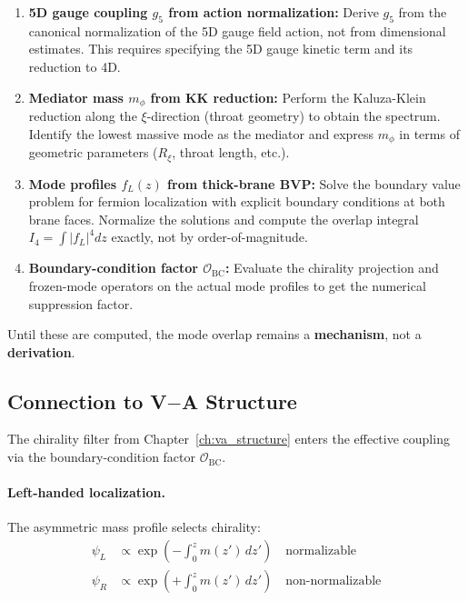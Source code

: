 \begin{enumerate}[nosep]
    \item \textbf{5D gauge coupling $g_5$ from action normalization:}
          Derive $g_5$ from the canonical normalization of the 5D gauge field
          action, not from dimensional estimates. This requires specifying the
          5D gauge kinetic term and its reduction to 4D.

    \item \textbf{Mediator mass $m_\phi$ from KK reduction:}
          Perform the Kaluza-Klein reduction along the $\xi$-direction (throat
          geometry) to obtain the spectrum. Identify the lowest massive mode
          as the mediator and express $m_\phi$ in terms of geometric parameters
          ($R_\xi$, throat length, etc.).

    \item \textbf{Mode profiles $f_L(z)$ from thick-brane BVP:}
          Solve the boundary value problem for fermion localization with
          explicit boundary conditions at both brane faces. Normalize the
          solutions and compute the overlap integral $I_4 = \int |f_L|^4 dz$
          exactly, not by order-of-magnitude.

    \item \textbf{Boundary-condition factor $\mathcal{O}_{\text{BC}}$:}
          Evaluate the chirality projection and frozen-mode operators on the
          actual mode profiles to get the numerical suppression factor.
\end{enumerate}

Until these are computed, the mode overlap remains a \textbf{mechanism}, not a
\textbf{derivation}.

\subsection{Connection to V$-$A Structure}
\label{sec:ch11_va}

The chirality filter from Chapter~\ref{ch:va_structure} enters the effective
coupling via the boundary-condition factor $\mathcal{O}_{\text{BC}}$.

\paragraph{Left-handed localization.}
The asymmetric mass profile selects chirality:
\begin{align}
    \psi_L &\propto \exp\left(-\int_0^z m(z')\,dz'\right) \quad \text{normalizable} \\
    \psi_R &\propto \exp\left(+\int_0^z m(z')\,dz'\right) \quad \text{non-normalizable}
\end{align}

